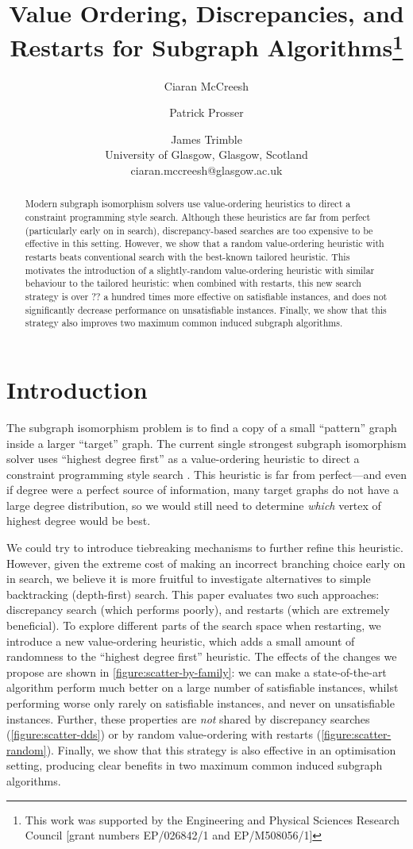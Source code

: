 \documentclass{article}
\title{Value Ordering, Discrepancies, and Restarts for Subgraph Algorithms\thanks{This work was
supported by the Engineering and Physical Sciences Research Council [grant numbers EP/026842/1 and EP/M508056/1]}}
\author{Ciaran McCreesh \and Patrick Prosser \and James Trimble\\ University of Glasgow, Glasgow, Scotland \\
    ciaran.mccreesh@glasgow.ac.uk}
\newcommand{\citep}[1]{\cite{#1}}
\begin{document}
\maketitle

\begin{abstract}
    Modern subgraph isomorphism solvers use value-ordering heuristics to direct a constraint
    programming style search. Although these heuristics are far from perfect (particularly early on
    in search), discrepancy-based searches are too expensive to be effective in this setting.
    However, we show that a random value-ordering heuristic with restarts beats conventional search
    with the best-known tailored heuristic. This motivates the introduction of a slightly-random
    value-ordering heuristic with similar behaviour to the tailored heuristic: when combined with
    restarts, this new search strategy is over ?? a hundred times more effective on satisfiable
    instances, and does not significantly decrease performance on unsatisfiable instances. Finally,
    we show that this strategy also improves two maximum common induced subgraph algorithms.
\end{abstract}

\section{Introduction}

The subgraph isomorphism problem is to find a copy of a small ``pattern'' graph inside a larger
``target'' graph.  The current single strongest subgraph isomorphism solver uses ``highest degree
first'' as a value-ordering heuristic to direct a constraint programming style search
\citep{DBLP:conf/cp/McCreeshP15,DBLP:conf/lion/KotthoffMS16,DBLP:conf/ijcai/McCreeshPT16}. This
heuristic is far from perfect---and even if degree were a perfect source of information,
many target graphs do not have a large degree distribution, so we would still need to determine
\emph{which} vertex of highest degree would be best.

We could try to introduce tiebreaking mechanisms to further refine this heuristic. However, given
the extreme cost of making an incorrect branching choice early on in search, we believe it is more
fruitful to investigate alternatives to simple backtracking (depth-first) search. This paper
evaluates two such approaches: discrepancy search (which performs poorly), and restarts (which are
extremely beneficial). To explore different parts of the search space when restarting, we introduce
a new value-ordering heuristic, which adds a small amount of randomness to the ``highest degree
first'' heuristic.  The effects of the changes we propose are shown in
\cref{figure:scatter-by-family}: we can make a state-of-the-art algorithm perform much better on a
large number of satisfiable instances, whilst performing worse only rarely on satisfiable instances,
and never on unsatisfiable instances.  Further, these properties are \emph{not} shared by
discrepancy searches (\cref{figure:scatter-dds}) or by random value-ordering with restarts
(\cref{figure:scatter-random}). Finally, we show that this strategy is also effective in an
optimisation setting, producing clear benefits in two maximum common induced subgraph algorithms.
\end{document}
